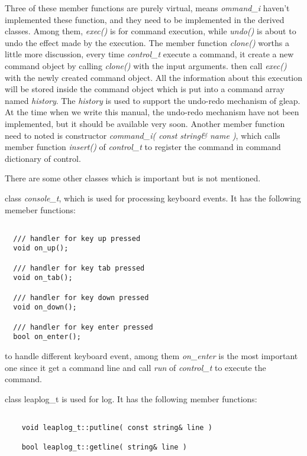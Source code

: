 \documentclass[letterpaper]{book}
\begin{document}
Three of these member functions are purely virtual, means {\it ommand\_i} haven't implemented these
function, and they need to be implemented in the derived classes. Among them, {\it exec()} is 
for command execution, while {\it undo()} is about to undo the effect made by the execution.
The member function {\it clone()} worths a little more discussion, every time {\it control\_t} execute
a command, it create a new command object by calling {\it clone()} with the input arguments. 
then call {\it exec()} with the newly created command object. All the information about this 
execution will be stored inside the command object which is put into a command array named
{\it history}. The {\it history} is used to support the undo-redo mechanism of gleap. At the
time when we write this manual, the undo-redo mechanism have not been implemented, but it
should be available very soon. Another member function need to noted is constructor 
{\it command\_i( const string\& name )}, which calls member function {\it insert()} of 
{\it control\_t} to register the command in command dictionary of control.


There are some other classes which is important but is not mentioned.

class {\it console\_t}, which is used for processing keyboard events. It has the following 
memeber functions:

\begin{lstlisting}

  /// handler for key up pressed
  void on_up();
    
  /// handler for key tab pressed
  void on_tab();
        
  /// handler for key down pressed
  void on_down();
    
  /// handler for key enter pressed
  bool on_enter();

\end{lstlisting}

to handle different keyboard event, among them {\it on\_enter} is the most important one since it get
a command line and call {\it run} of {\it control\_t} to execute the command.

class leaplog\_t is used for log. It has the following member functions:

\begin{lstlisting}

    void leaplog_t::putline( const string& line )

    bool leaplog_t::getline( string& line )

\end{lstlisting}
\end{document}
